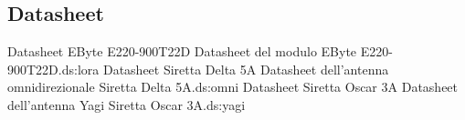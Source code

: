 \documentclass[12pt,a4paper,twoside]{book}
\begin{document}
\begin{appendices}
    \chapter{Datasheet} \label{app:datasheet}
    \begin{enumerate}
        {Datasheet EByte E220-900T22D}%
        {Datasheet del modulo EByte E220-900T22D.}{ds:lora}
        {Datasheet Siretta Delta 5A}%
        {Datasheet dell'antenna omnidirezionale Siretta Delta 5A.}{ds:omni}
        {Datasheet Siretta Oscar 3A}%
        {Datasheet dell'antenna Yagi Siretta Oscar 3A.}{ds:yagi}
    \end{enumerate}

\end{appendices}

\end{document}
